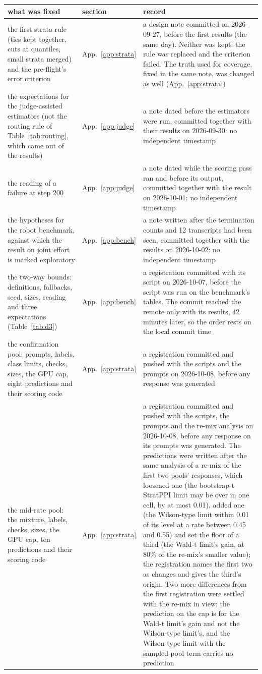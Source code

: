 \begin{tabular}{@{}p{5.6cm} l p{9.2cm}@{}}
\toprule
\textbf{what was fixed} & \textbf{section} & \textbf{record} \\
\midrule
the first strata rule (ties kept together, cuts at quantiles, small strata merged) and the pre-flight's error criterion & App.~\ref{app:strata} & a design note committed on 2026-09-27, before the first results (the same day). Neither was kept: the rule was replaced and the criterion failed. The truth used for coverage, fixed in the same note, was changed as well (App.~\ref{app:strata}) \\
the expectations for the judge-assisted estimators (not the routing rule of Table~\ref{tab:routing}, which came out of the results) & App.~\ref{app:judge} & a note dated before the estimators were run, committed together with their results on 2026-09-30: no independent timestamp \\
the reading of a failure at step 200 & App.~\ref{app:judge} & a note dated while the scoring pass ran and before its output, committed together with the result on 2026-10-01: no independent timestamp \\
the hypotheses for the robot benchmark, against which the result on joint effort is marked exploratory & App.~\ref{app:bench} & a note written after the termination counts and 12 transcripts had been seen, committed together with the results on 2026-10-02: no independent timestamp \\
the two-way bounds: definitions, fallbacks, seed, sizes, reading and three expectations (Table~\ref{tab:d3}) & App.~\ref{app:bench} & a registration committed with its script on 2026-10-07, before the script was run on the benchmark's tables. The commit reached the remote only with its results, 42 minutes later, so the order rests on the local commit time \\
the confirmation pool: prompts, labels, class limits, checks, sizes, the GPU cap, eight predictions and their scoring code & App.~\ref{app:strata} & a registration committed and pushed with the scripts and the prompts on 2026-10-08, before any response was generated \\
the mid-rate pool: the mixture, labels, checks, sizes, the GPU cap, ten predictions and their scoring code & App.~\ref{app:strata} & a registration committed and pushed with the scripts, the prompts and the re-mix analysis on 2026-10-08, before any response on its prompts was generated. The predictions were written after the same analysis of a re-mix of the first two pools' responses, which loosened one (the bootstrap-t StratPPI limit may be over in one cell, by at most 0.01), added one (the Wilson-type limit within 0.01 of its level at a rate between 0.45 and 0.55) and set the floor of a third (the Wald-t limit's gain, at 80\% of the re-mix's smaller value); the registration names the first two as changes and gives the third's origin. Two more differences from the first registration were settled with the re-mix in view: the prediction on the cap is for the Wald-t limit's gain and not the Wilson-type limit's, and the Wilson-type limit with the sampled-pool term carries no prediction \\

\end{tabular}
